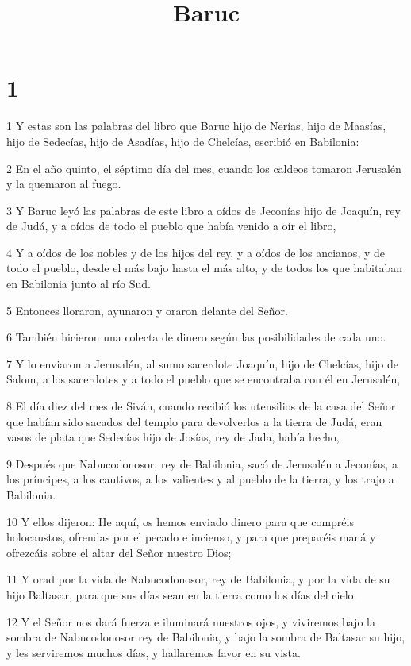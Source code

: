 

\title{Baruc}


\chapter{1}

\par 1 Y estas son las palabras del libro que Baruc hijo de Nerías, hijo de Maasías, hijo de Sedecías, hijo de Asadías, hijo de Chelcías, escribió en Babilonia:
\par 2 En el año quinto, el séptimo día del mes, cuando los caldeos tomaron Jerusalén y la quemaron al fuego.
\par 3 Y Baruc leyó las palabras de este libro a oídos de Jeconías hijo de Joaquín, rey de Judá, y a oídos de todo el pueblo que había venido a oír el libro,
\par 4 Y a oídos de los nobles y de los hijos del rey, y a oídos de los ancianos, y de todo el pueblo, desde el más bajo hasta el más alto, y de todos los que habitaban en Babilonia junto al río Sud.
\par 5 Entonces lloraron, ayunaron y oraron delante del Señor.
\par 6 También hicieron una colecta de dinero según las posibilidades de cada uno.
\par 7 Y lo enviaron a Jerusalén, al sumo sacerdote Joaquín, hijo de Chelcías, hijo de Salom, a los sacerdotes y a todo el pueblo que se encontraba con él en Jerusalén,
\par 8 El día diez del mes de Siván, cuando recibió los utensilios de la casa del Señor que habían sido sacados del templo para devolverlos a la tierra de Judá, eran vasos de plata que Sedecías hijo de Josías, rey de Jada, había hecho,
\par 9 Después que Nabucodonosor, rey de Babilonia, sacó de Jerusalén a Jeconías, a los príncipes, a los cautivos, a los valientes y al pueblo de la tierra, y los trajo a Babilonia.
\par 10 Y ellos dijeron: He aquí, os hemos enviado dinero para que compréis holocaustos, ofrendas por el pecado e incienso, y para que preparéis maná y ofrezcáis sobre el altar del Señor nuestro Dios;
\par 11 Y orad por la vida de Nabucodonosor, rey de Babilonia, y por la vida de su hijo Baltasar, para que sus días sean en la tierra como los días del cielo.
\par 12 Y el Señor nos dará fuerza e iluminará nuestros ojos, y viviremos bajo la sombra de Nabucodonosor rey de Babilonia, y bajo la sombra de Baltasar su hijo, y les serviremos muchos días, y hallaremos favor en su vista.
